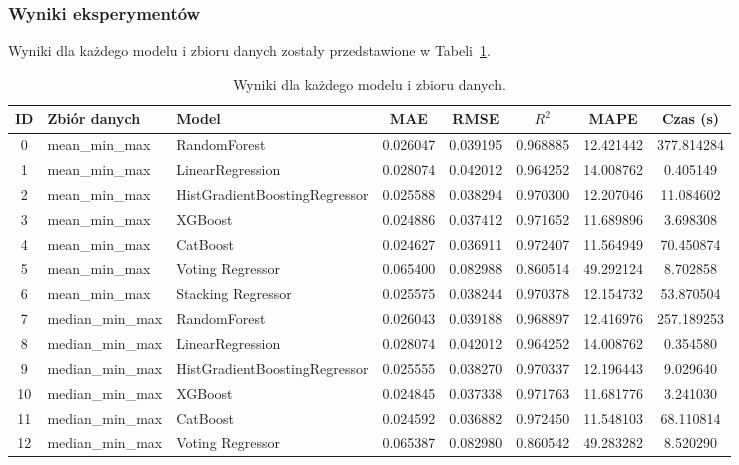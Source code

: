 \documentclass[10pt,letterpaper]{article}
\begin{document}
\subsubsection{Wyniki eksperymentów}
Wyniki dla każdego modelu i zbioru danych zostały przedstawione w Tabeli~\ref{tab:results_all}.
\begin{table}[H]
	\centering
\caption{Wyniki dla każdego modelu i zbioru danych.}
\label{tab:results_all}
\begin{tabular}{|c|l|l|c|c|c|c|c|}
	\hline
	\textbf{ID} & \textbf{Zbiór danych} & \textbf{Model} & \textbf{MAE} & \textbf{RMSE} & \textbf{\(R^2\)} & \textbf{MAPE} & \textbf{Czas (s)} \\ \hline
	0 & mean\_min\_max & RandomForest & 0.026047 & 0.039195 & 0.968885 & 12.421442 & 377.814284 \\ \hline
	1 & mean\_min\_max & LinearRegression & 0.028074 & 0.042012 & 0.964252 & 14.008762 & 0.405149 \\ \hline
	2 & mean\_min\_max & HistGradientBoostingRegressor & 0.025588 & 0.038294 & 0.970300 & 12.207046 & 11.084602 \\ \hline
	3 & mean\_min\_max & XGBoost & 0.024886 & 0.037412 & 0.971652 & 11.689896 & 3.698308 \\ \hline
	4 & mean\_min\_max & CatBoost & 0.024627 & 0.036911 & 0.972407 & 11.564949 & 70.450874 \\ \hline
	5 & mean\_min\_max & Voting Regressor & 0.065400 & 0.082988 & 0.860514 & 49.292124 & 8.702858 \\ \hline
	6 & mean\_min\_max & Stacking Regressor & 0.025575 & 0.038244 & 0.970378 & 12.154732 & 53.870504 \\ \hline
	7 & median\_min\_max & RandomForest & 0.026043 & 0.039188 & 0.968897 & 12.416976 & 257.189253 \\ \hline
	8 & median\_min\_max & LinearRegression & 0.028074 & 0.042012 & 0.964252 & 14.008762 & 0.354580 \\ \hline
	9 & median\_min\_max & HistGradientBoostingRegressor & 0.025555 & 0.038270 & 0.970337 & 12.196443 & 9.029640 \\ \hline
	10 & median\_min\_max & XGBoost & 0.024845 & 0.037338 & 0.971763 & 11.681776 & 3.241030 \\ \hline
	11 & median\_min\_max & CatBoost & 0.024592 & 0.036882 & 0.972450 & 11.548103 & 68.110814 \\ \hline
	12 & median\_min\_max & Voting Regressor & 0.065387 & 0.082980 & 0.860542 & 49.283282 & 8.520290 \\ \hline

\end{tabular}
\end{table}
\end{document}
